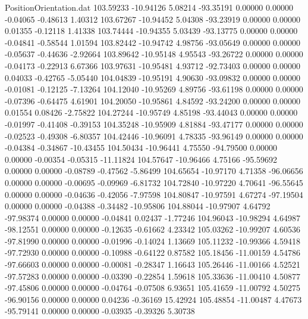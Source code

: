 \begin{filecontents}{PositionOrientation.dat}
 103.59233  -10.94126    5.08214   -93.35191    0.00000    0.00000   -0.04065   -0.48613    1.40312
 103.67267  -10.94452    5.04308   -93.23919    0.00000    0.00000    0.01355   -0.12118    1.41338
 103.74444  -10.94355    5.03439   -93.13775    0.00000    0.00000   -0.04841   -0.58544    1.01594
 103.82442  -10.94742    4.98756   -93.05649    0.00000    0.00000   -0.05637   -0.44636   -2.92664
 103.89642  -10.95148    4.95543   -93.26722    0.00000    0.00000   -0.04173   -0.22913    6.67366
 103.97631  -10.95481    4.93712   -92.73403    0.00000    0.00000    0.04033   -0.42765   -5.05440
 104.04839  -10.95191    4.90630   -93.09832    0.00000    0.00000   -0.01081   -0.12125   -7.13264
 104.12040  -10.95269    4.89756   -93.61198    0.00000    0.00000   -0.07396   -0.64475    4.61901
 104.20050  -10.95861    4.84592   -93.24200    0.00000    0.00000    0.01554    0.08426   -2.75822
 104.27244  -10.95749    4.85198   -93.44043    0.00000    0.00000   -0.01997   -0.41408   -0.39153
 104.35248  -10.95909    4.81884   -93.47177    0.00000    0.00000   -0.02523   -0.49308   -6.80357
 104.42446  -10.96091    4.78335   -93.96149    0.00000    0.00000   -0.04384   -0.34867  -10.43455
 104.50434  -10.96441    4.75550   -94.79500    0.00000    0.00000   -0.00354   -0.05315  -11.11824
 104.57647  -10.96466    4.75166   -95.59692    0.00000    0.00000   -0.08789   -0.47562   -5.86499
 104.65654  -10.97170    4.71358   -96.06656    0.00000    0.00000   -0.00695   -0.09969   -6.81732
 104.72840  -10.97220    4.70641   -96.55645    0.00000    0.00000   -0.04636   -0.42056   -7.97598
 104.80847  -10.97591    4.67274   -97.19504    0.00000    0.00000   -0.04388   -0.34482  -10.95806
 104.88044  -10.97907    4.64792   -97.98374    0.00000    0.00000   -0.04841    0.02437   -1.77246
 104.96043  -10.98294    4.64987   -98.12551    0.00000    0.00000   -0.12635   -0.61662    4.23342
 105.03262  -10.99207    4.60536   -97.81990    0.00000    0.00000   -0.01996   -0.14024    1.13669
 105.11232  -10.99366    4.59418   -97.72930    0.00000    0.00000   -0.10988   -0.64122    0.87582
 105.18456  -11.00159    4.54786   -97.66603    0.00000    0.00000   -0.00081   -0.28347    1.16643
 105.26446  -11.00166    4.52521   -97.57283    0.00000    0.00000   -0.03390   -0.22854    1.59618
 105.33636  -11.00410    4.50877   -97.45806    0.00000    0.00000   -0.04764   -0.07508    6.93651
 105.41659  -11.00792    4.50275   -96.90156    0.00000    0.00000    0.04236   -0.36169   15.42924
 105.48854  -11.00487    4.47673   -95.79141    0.00000    0.00000   -0.03935   -0.39326    5.30738

\end{filecontents}
